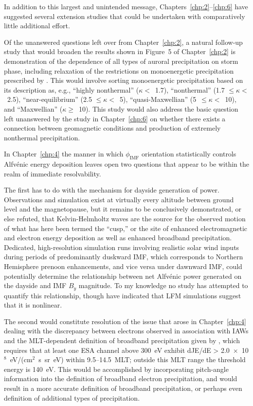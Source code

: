   In addition to this largest and unintended message,
  Chapters~\ref{chp:2}--\ref{chp:6} have suggested several extension
  studies that could be undertaken with comparatively little
  additional effort.

  Of the unanswered questions left over from Chapter~\ref{chp:2}, a
  natural follow-up study that would broaden the results shown in
  Figure~5 of Chapter~\ref{chp:2} is demonstration of the dependence
  of all types of auroral precipitation on storm phase, including
  relaxation of the restrictions on monoenergetic precipitation
  prescribed by \citet{McIntosh2014}. This would involve sorting
  monoenergetic precipitation based on its description as, e.g.,
  ``highly nonthermal'' ($\kappa <$~1.7), ``nonthermal'' (1.7 $\leq
  \kappa <$~2.5), ``near-equilibrium'' (2.5 $\leq \kappa <$~5),
  ``quasi-Maxwellian'' (5~$\leq \kappa <$~10), and ``Maxwellian''
  ($\kappa \geq$~10). This study would also address the basic question
  left unanswered by the study in Chapter~\ref{chp:6} on whether there
  exists a connection between geomagnetic conditions and production of
  extremely nonthermal precipitation.

  In Chapter~\ref{chp:4} the manner in which $\phi_{\textrm{IMF}}$
  orientation statistically controls Alfv\'{e}nic energy deposition
  leaves open two questions that appear to be within the realm of
  immediate resolvability.

  The first has to do with the mechanism for dayside generation of
  \Alfic power. Observations and simulation exist at virtually every
  altitude between ground level and the magnetopause, but it remains
  to be conclusively demonstrated, or else refuted, that
  Kelvin-Helmholtz waves are the source for the observed motion of
  what has here been termed the ``\Alfic cusp,'' or the site of
  enhanced \Alfic electromagnetic and electron energy deposition as
  well as enhanced broadband precipitation. Dedicated, high-resolution
  simulation runs involving realistic solar wind inputs during periods
  of predominantly duskward IMF, which corresponds to Northern
  Hemisphere prenoon \Alfic enhancements, and vice versa under
  dawnward IMF, could potentially determine the relationship between
  net Alfv\'{e}nic power generated on the dayside and IMF $B_y$
  magnitude. To my knowledge no study has attempted to quantify this
  relationship, though \citet{Zhang2014} have indicated that LFM
  simulations suggest that it is nonlinear.

  The second would constitute resolution of the issue that arose in
  Chapter~\ref{chp:4} dealing with the discrepancy between electrons
  observed in association with IAWs and the MLT-dependent definition
  of broadband precipitation given by \citet{Newell2009}, which
  requires that at least one ESA channel above 300~eV exhibit dJE/dE >
  2.0~$\times$~10$^8$~eV/(cm$^2$~s~sr~eV) within 9.5--14.5~MLT;
  outside this MLT range the threshold energy is 140~eV. This would be
  accomplished by incorporating pitch-angle information into the
  definition of broadband electron precipitation, and would result in
  a more accurate definition of broadband precipitation, or perhaps
  even definition of additional types of precipitation.


